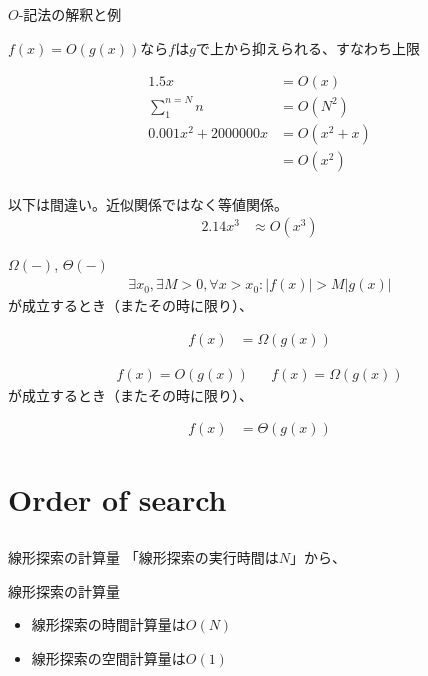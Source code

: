 \documentclass{beamer}
\begin{document}
\begin{frame}[fragile]{$O$-記法の解釈と例}{}

$f(x) = O(g(x))$なら$f$は$g$で上から抑えられる、すなわち上限

\begin{align*}
1.5 x & = O(x) \\
\sum_{1}^{n=N} n & = O(N^2) \\
0.001x^2 + 2000000x & = O(x^2 + x) \\
         & = O(x^2) \\
\end{align*}

\vfill
以下は間違い。近似関係ではなく等値関係。
\begin{align*}
2.14x^3 & \approx O(x^3)
\end{align*}
\end{frame}

\begin{frame}[fragile]{$\Omega(-)$, $\Theta(-)$}{}
\begin{align*}
\exists x_{0}, \exists M > 0,  \forall x > x_{0} : |f(x)| > M | g(x) |
\end{align*}
が成立するとき（またその時に限り）、

\begin{align*}
f(x) &= \Omega(g(x))
\end{align*}

\vfill
\begin{align*}
f(x) = O(g(x)) && f(x) = \Omega(g(x))
\end{align*}
が成立するとき（またその時に限り）、

\begin{align*}
f(x) &= \Theta(g(x))
\end{align*}
\end{frame}

\section{Order of search}		%
\subsection{}

\begin{frame}[fragile]{線形探索の計算量}{}
「線形探索の実行時間は$N$」から、

\begin{block}{線形探索の計算量}
\begin{itemize}\itemsep8pt
\item 線形探索の時間計算量は$O(N)$\footnotemark
\item 線形探索の空間計算量は$O(1)$\footnotemark
\end{itemize}
\end{block}

\end{frame}
\end{document}
